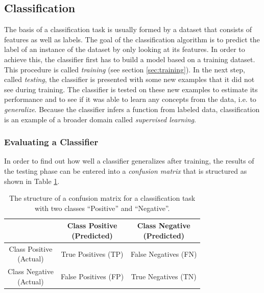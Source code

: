 \subsection{Classification}

The basis of a classification task is usually formed by a dataset that
consists of features as well as labels. The goal of the classification
algorithm is to predict the label of an instance of the dataset by
only looking at its features. In order to achieve this, the classifier
first has to build a model based on a training dataset. This procedure is called
\textit{training} (see section \ref{sec:training}). In the next step,
called \textit{testing}, the classifier is presented with
some new examples that it did not see during training. The classifier
is tested on these new examples to estimate its performance and to see
if it was able to learn any concepts from the data, i.e. to
\textit{generalize}. Because the classifier infers a function from
labeled data, classification is an example of a broader domain
called \textit{supervised learning}.

\subsubsection{Evaluating a Classifier}

In order to find out how well a classifier generalizes after training,
the results of the testing phase can be entered into a
\textit{confusion matrix} that is structured as shown in Table
\ref{tbl:confusion-matrix}.
\begin{table}[h]
  \centering
  \renewcommand\theadfont{\bfseries}
  \begin{tabular}{|c|c|c|}
    \hline
    & \thead{Class Positive\\(Predicted)} & \thead{Class Negative\\(Predicted)} \\
    \hline
    \thead{Class Positive\\(Actual)} & True Positives (TP) & False
    Negatives (FN) \\
    \hline
    \thead{Class Negative\\(Actual)} & False Positives (FP) & True
    Negatives (TN) \\
    \hline
  \end{tabular}
  \caption{The structure of a confusion matrix for a
    classification task with two classes ``Positive'' and
    ``Negative''.}
  \label{tbl:confusion-matrix}
\end{table}

